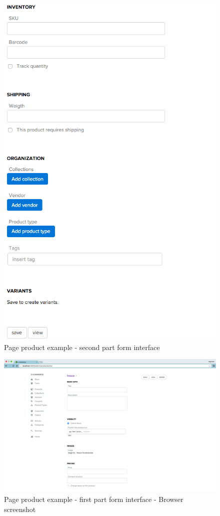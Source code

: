 \begin{figure}[htb]
\centering
\includegraphics[width=1.0\linewidth]{images/chapter4/products-example1.png}\hfill
\caption[page product second part form]{Page product example - second part form interface}
\label{fig:design_page}
\end{figure}
\begin{figure}[htb]
\centering
\includegraphics[width=1.0\linewidth]{images/chapter4/prod-part1-all.png}\hfill
\caption[page product first part form browser]{Page product example - first part form interface - Browser screenshot}
\label{fig:design_page}
\end{figure}

